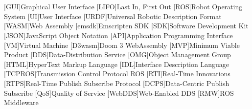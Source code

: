 \chapter*{}



\section*{}
\begin{acronym}[LONGEST]

    [GUI]{Graphical User Interface}
    [LIFO]{Last In, First Out}
    [ROS]{Robot Operating System}
    [UI]{User Interface}
    [URDF]{Universal Robotic Description Format}
    [WASM]{Web Assembly}
    [emsdk]{Emscripten SDK}
    [SDK]{Software Development Kit}
    [JSON]{JavaScript Object Notation}
    [API]{Application Programming Interface}
    [VM]{Virtual Machine}
    [D3wasm]{Doom 3 WebAssembly}
    [MVP]{Minimum Viable Product}
    [DDS]{Data-Distribution Service}
    [OMG]{Object Management Group}
    [HTML]{HyperText Markup Language}
    [IDL]{Interface Description Language}
    [TCPROS]{Transmission Control Protocol ROS}
    [RTI]{Real-Time Innovations}
    [RTPS]{Real-Time Publish Subscribe Protocol}
    [DCPS]{Data-Centric Publish Subscribe}
    [QoS]{Quality of Service}
    [WebDDS]{Web-Enabled DDS}
    [RMW]{ROS Middleware}

\end{acronym}







